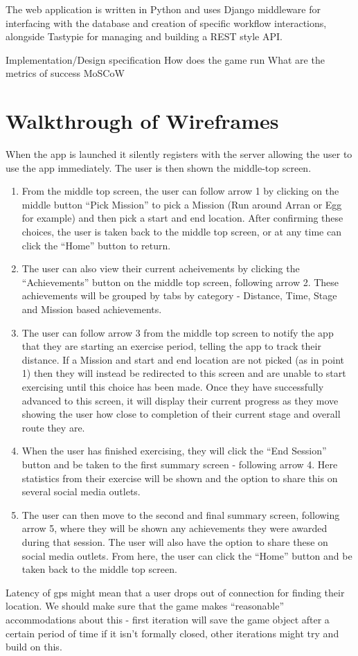 The web application is written in Python and uses Django middleware for interfacing with the database and creation of specific workflow interactions, alongside Tastypie for managing and building a REST style API. 

Implementation/Design specification
How does the game run
What are the metrics of success
MoSCoW


\section{Walkthrough of Wireframes}
When the app is launched it silently registers with the server
allowing the user to use the app immediately. The user is then shown
the middle-top screen.
\begin{enumerate}
  \item From the middle top screen, the user can follow arrow 1 by
    clicking on the middle button ``Pick Mission'' to pick a Mission
    (Run around Arran or Egg for example) and then pick a start and
    end location. After confirming these choices, the user is taken
    back to the middle top screen, or at any time can click the
    ``Home'' button to return. 
  \item The user can also view their current acheivements by clicking
    the ``Achievements'' button on the middle top screen, following
    arrow 2. These achievements will be grouped by tabs by category -
    Distance, Time, Stage and Mission based achievements.
  \item The user can follow arrow 3 from the middle top screen to
    notify the app that they are starting an exercise period, telling
    the app to track their distance. If a Mission and start and end
    location are not picked (as in point 1) then they will instead be
    redirected to this screen and are unable to start exercising until
    this choice has been made. Once they have successfully advanced to
    this screen, it will display their current progress as they move
    showing the user how close to completion of their current stage
    and overall route they are. 
  \item When the user has finished exercising, they will click the
    ``End Session'' button and be taken to the first summary screen -
    following arrow 4. Here statistics from their exercise will be
    shown and the option to share this on several social media
    outlets.
  \item The user can then move to the second and final summary screen,
    following arrow 5, where they will be shown any achievements they
    were awarded during that session. The user will also have the
    option to share these on social media outlets. From here, the user
    can click the ``Home'' button and be taken back to the middle top
    screen. 
\end{enumerate}

Latency of gps might mean that a user drops out of connection for
finding their location. We should make sure that the game makes
``reasonable'' accommodations about this - first iteration will save
the game object after a certain period of time if it isn't formally
closed, other iterations might try and build on this.

